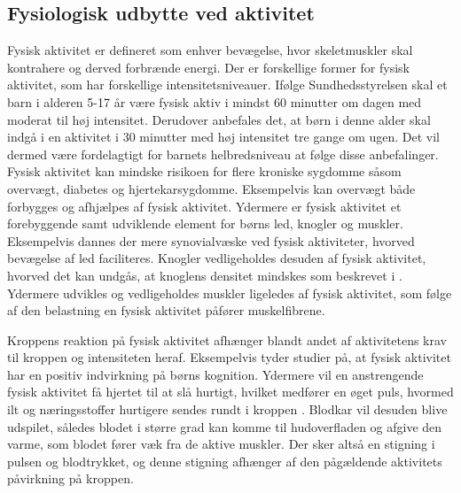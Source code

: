 \subsection{Fysiologisk udbytte ved aktivitet}\label{subsec:fysio_aktivitet}
Fysisk aktivitet er defineret som enhver bevægelse, hvor skeletmuskler skal kontrahere og derved forbrænde energi. Der er forskellige former for fysisk aktivitet, som har forskellige intensitetsniveauer. \citep{Academic2016a} Ifølge Sundhedsstyrelsen skal et barn i alderen 5-17 år være fysisk aktiv i mindst 60 minutter om dagen med moderat til høj intensitet. Derudover anbefales det, at børn i denne alder skal indgå i en aktivitet i 30 minutter med høj intensitet tre gange om ugen. Det vil dermed være fordelagtigt for barnets helbredsniveau at følge disse anbefalinger.~\citep{Sundhedsstyrelsen2016}\newline
Fysisk aktivitet kan mindske risikoen for flere kroniske sygdomme såsom overvægt, diabetes og hjertekarsygdomme. Eksempelvis kan overvægt både forbygges og afhjælpes af fysisk aktivitet. Ydermere er fysisk aktivitet et forebyggende samt udviklende element for børns led, knogler og muskler. Eksempelvis dannes der mere synovialvæske ved fysisk aktiviteter, hvorved bevægelse af led faciliteres. Knogler vedligeholdes desuden af fysisk aktivitet, hvorved det kan undgås, at knoglens densitet mindskes som beskrevet i . Ydermere udvikles og vedligeholdes muskler ligeledes af fysisk aktivitet, som følge af den belastning en fysisk aktivitet påfører muskelfibrene.  %
\citep{Academic2016a,Smith1991,Academic2016b,Cotman2007,CenterforDiseaseControlandPrevention2015}

Kroppens reaktion på fysisk aktivitet afhænger blandt andet af aktivitetens krav til kroppen og intensiteten heraf. %
Eksempelvis tyder studier på, at fysisk aktivitet har en positiv indvirkning på børns kognition. \citep{SibleyEtnier2003} Ydermere vil en anstrengende fysisk aktivitet få hjertet til at slå hurtigt, hvilket medfører en øget puls, hvormed ilt og næringsstoffer hurtigere sendes rundt i kroppen \citep{Hjerteforeningen}. Blodkar vil desuden blive udspilet, således blodet i større grad kan komme til hudoverfladen og afgive den varme, som blodet fører væk fra de aktive muskler. Der sker altså en stigning i pulsen og blodtrykket, og denne stigning afhænger af den pågældende aktivitets påvirkning på kroppen. \citep{Martini2012,Stanfield2013,Berchtold2010}


